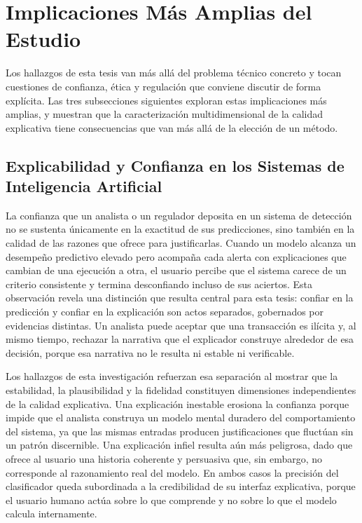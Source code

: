 \section{Implicaciones Más Amplias del Estudio}

Los hallazgos de esta tesis van más allá del problema técnico concreto y tocan cuestiones de confianza, ética y regulación que conviene discutir de forma explícita. Las tres subsecciones siguientes exploran estas implicaciones más amplias, y muestran que la caracterización multidimensional de la calidad explicativa tiene consecuencias que van más allá de la elección de un método.

\subsection{Explicabilidad y Confianza en los Sistemas de Inteligencia Artificial}

La confianza que un analista o un regulador deposita en un sistema de detección no se sustenta únicamente en la exactitud de sus predicciones, sino también en la calidad de las razones que ofrece para justificarlas. Cuando un modelo alcanza un desempeño predictivo elevado pero acompaña cada alerta con explicaciones que cambian de una ejecución a otra, el usuario percibe que el sistema carece de un criterio consistente y termina desconfiando incluso de sus aciertos. Esta observación revela una distinción que resulta central para esta tesis: confiar en la predicción y confiar en la explicación son actos separados, gobernados por evidencias distintas. Un analista puede aceptar que una transacción es ilícita y, al mismo tiempo, rechazar la narrativa que el explicador construye alrededor de esa decisión, porque esa narrativa no le resulta ni estable ni verificable.

Los hallazgos de esta investigación refuerzan esa separación al mostrar que la estabilidad, la plausibilidad y la fidelidad constituyen dimensiones independientes de la calidad explicativa. Una explicación inestable erosiona la confianza porque impide que el analista construya un modelo mental duradero del comportamiento del sistema, ya que las mismas entradas producen justificaciones que fluctúan sin un patrón discernible. Una explicación infiel resulta aún más peligrosa, dado que ofrece al usuario una historia coherente y persuasiva que, sin embargo, no corresponde al razonamiento real del modelo. En ambos casos la precisión del clasificador queda subordinada a la credibilidad de su interfaz explicativa, porque el usuario humano actúa sobre lo que comprende y no sobre lo que el modelo calcula internamente.

